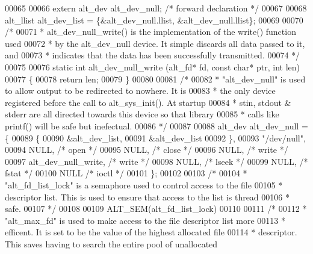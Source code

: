 \begin{DoxyCode}
00065 
00066 \textcolor{keyword}{extern} alt_dev alt_dev_null; \textcolor{comment}{/* forward declaration */}
00067 
00068 alt_llist alt_dev_list = \{&alt\_dev\_null.llist, &alt\_dev\_null.llist\};
00069 
00070 \textcolor{comment}{/*}
00071 \textcolor{comment}{ * alt\_dev\_null\_write() is the implementation of the write() function used}
00072 \textcolor{comment}{ * by the alt\_dev\_null device. It simple discards all data passed to it, and}
00073 \textcolor{comment}{ * indicates that the data has been successfully transmitted.}
00074 \textcolor{comment}{ */}
00075 
00076 \textcolor{keyword}{static} \textcolor{keywordtype}{int} alt_dev_null_write (alt_fd* fd, \textcolor{keyword}{const} \textcolor{keywordtype}{char}* ptr, \textcolor{keywordtype}{int} len)
00077 \{
00078   \textcolor{keywordflow}{return} len;
00079 \}
00080 
00081 \textcolor{comment}{/*}
00082 \textcolor{comment}{ * "alt\_dev\_null" is used to allow output to be redirected to nowhere. It is}
00083 \textcolor{comment}{ * the only device registered before the call to alt\_sys\_init(). At startup }
00084 \textcolor{comment}{ * stin, stdout & stderr are all directed towards this device so that library }
00085 \textcolor{comment}{ * calls like printf() will be safe but inefectual.  }
00086 \textcolor{comment}{ */}
00087 
00088 alt_dev alt\_dev\_null = \{
00089    \{
00090      &alt_dev_list,
00091      &alt\_dev\_list
00092    \},
00093    \textcolor{stringliteral}{"/dev/null"},
00094    NULL,               \textcolor{comment}{/* open */}
00095    NULL,               \textcolor{comment}{/* close */}
00096    NULL,               \textcolor{comment}{/* write */}
00097    alt_dev_null_write, \textcolor{comment}{/* write */}
00098    NULL,               \textcolor{comment}{/* lseek */}   
00099    NULL,               \textcolor{comment}{/* fstat */} 
00100    NULL                \textcolor{comment}{/* ioctl */}
00101  \};
00102 
00103 \textcolor{comment}{/*}
00104 \textcolor{comment}{ * "alt\_fd\_list\_lock" is a semaphore used to control access to the file}
00105 \textcolor{comment}{ * descriptor list. This is used to ensure that access to the list is thread}
00106 \textcolor{comment}{ * safe.  }
00107 \textcolor{comment}{ */}
00108 
00109 ALT_SEM(alt\_fd\_list\_lock)
00110 
00111 \textcolor{comment}{/*}
00112 \textcolor{comment}{ * "alt\_max\_fd" is used to make access to the file descriptor list more }
00113 \textcolor{comment}{ * efficent. It is set to be the value of the highest allocated file }
00114 \textcolor{comment}{ * descriptor. This saves having to search the entire pool of unallocated}

\end{DoxyCode}
